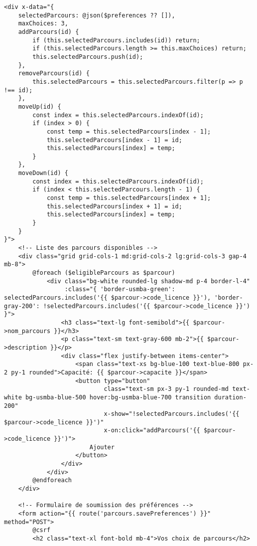 \documentclass[french,12pt]{report} %
\begin{document}
\begin{lstlisting}[style=htmlstyle,caption={Exemple d'utilisation d'Alpine.js pour la sélection de parcours}]
<div x-data="{ 
    selectedParcours: @json($preferences ?? []),
    maxChoices: 3,
    addParcours(id) {
        if (this.selectedParcours.includes(id)) return;
        if (this.selectedParcours.length >= this.maxChoices) return;
        this.selectedParcours.push(id);
    },
    removeParcours(id) {
        this.selectedParcours = this.selectedParcours.filter(p => p !== id);
    },
    moveUp(id) {
        const index = this.selectedParcours.indexOf(id);
        if (index > 0) {
            const temp = this.selectedParcours[index - 1];
            this.selectedParcours[index - 1] = id;
            this.selectedParcours[index] = temp;
        }
    },
    moveDown(id) {
        const index = this.selectedParcours.indexOf(id);
        if (index < this.selectedParcours.length - 1) {
            const temp = this.selectedParcours[index + 1];
            this.selectedParcours[index + 1] = id;
            this.selectedParcours[index] = temp;
        }
    }
}">
    <!-- Liste des parcours disponibles -->
    <div class="grid grid-cols-1 md:grid-cols-2 lg:grid-cols-3 gap-4 mb-8">
        @foreach ($eligibleParcours as $parcour)
            <div class="bg-white rounded-lg shadow-md p-4 border-l-4" 
                 :class="{ 'border-usmba-green': selectedParcours.includes('{{ $parcour->code_licence }}'), 'border-gray-200': !selectedParcours.includes('{{ $parcour->code_licence }}') }">
                <h3 class="text-lg font-semibold">{{ $parcour->nom_parcours }}</h3>
                <p class="text-sm text-gray-600 mb-2">{{ $parcour->description }}</p>
                <div class="flex justify-between items-center">
                    <span class="text-xs bg-blue-100 text-blue-800 px-2 py-1 rounded">Capacité: {{ $parcour->capacite }}</span>
                    <button type="button" 
                            class="text-sm px-3 py-1 rounded-md text-white bg-usmba-blue-500 hover:bg-usmba-blue-700 transition duration-200"
                            x-show="!selectedParcours.includes('{{ $parcour->code_licence }}')"
                            x-on:click="addParcours('{{ $parcour->code_licence }}')">
                        Ajouter
                    </button>
                </div>
            </div>
        @endforeach
    </div>
    
    <!-- Formulaire de soumission des préférences -->
    <form action="{{ route('parcours.savePreferences') }}" method="POST">
        @csrf
        <h2 class="text-xl font-bold mb-4">Vos choix de parcours</h2>
        

\end{lstlisting}
\end{document}

